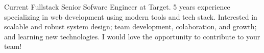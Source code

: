 

\begin{cvparagraph}

Current Fullstack Senior Sofware Engineer at Target. 5 years experience specializing in web development using modern tools and tech stack. Interested in scalable and robust system design; team development, colaboration, and growth; and learning new technologies. I would love the opportunity to contribute to your team!
\end{cvparagraph}
